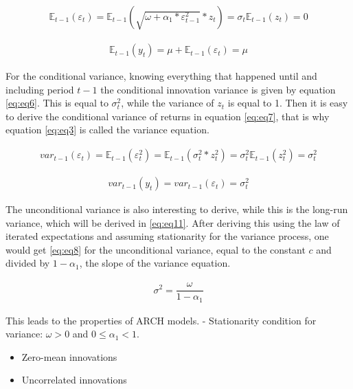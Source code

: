 \documentclass[a4paper, twoside]{templates/ociamthesis}
\begin{document}
\begin{align} 
\mathbb{E}_{t-1}(\varepsilon_{t}) = \mathbb{E}_{t-1}(\sqrt{\omega + \alpha_1 *  \varepsilon_{t-1}^2} * z_t) = \sigma_t\mathbb{E}_{t-1}(z_t) = 0
 \label{eq:eq4}
\end{align} 

\begin{align} 
\mathbb{E}_{t-1}(y_{t}) = \mu + \mathbb{E}_{t-1}(\varepsilon_{t}) = \mu
 \label{eq:eq5}
\end{align}

\noindent For the conditional variance, knowing everything that happened until and including period \(t-1\) the conditional innovation variance is given by equation \eqref{eq:eq6}. This is equal to \(\sigma_t^2\), while the variance of \(z_t\) is equal to 1. Then it is easy to derive the conditional variance of returns in equation \eqref{eq:eq7}, that is why equation \eqref{eq:eq3} is called the variance equation.

\begin{align} 
var_{t-1}(\varepsilon_t) = \mathbb{E}_{t-1}(\varepsilon_{t}^2) = \mathbb{E}_{t-1}(\sigma_t^2 * z_t^2) = \sigma_t^2\mathbb{E}_{t-1}(z_t^2) = \sigma_t^2
 \label{eq:eq6}
\end{align} 

\begin{align} 
var_{t-1}(y_t) = var_{t-1}(\varepsilon_t)= \sigma_t^2
 \label{eq:eq7}
\end{align}

\noindent The unconditional variance is also interesting to derive, while this is the long-run variance, which will be derived in \eqref{eq:eq11}. After deriving this using the law of iterated expectations and assuming stationarity for the variance process, one would get \eqref{eq:eq8} for the unconditional variance, equal to the constant \(c\) and divided by \(1-\alpha_1\), the slope of the variance equation.

\begin{align} 
\sigma^2 = \dfrac{\omega}{1-\alpha_1}
 \label{eq:eq8}
\end{align}

\noindent This leads to the properties of ARCH models. - Stationarity condition for variance: \(\omega>0\) and \(0 \le \alpha_1 < 1\).

\begin{itemize}
\item
  Zero-mean innovations
\item
  Uncorrelated innovations
\end{itemize}
\end{document}
